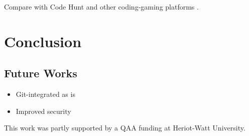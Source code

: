 \documentclass[sigplan,10pt,review]{acmart}\settopmatter{printfolios=true}
\begin{document}
Compare with Code Hunt and other coding-gaming platforms \cite{CHESE}.


\section{Conclusion}


\subsection{Future Works}


\begin{itemize}
\item Git-integrated as is \cite{Rue+Hic+Par+Lev+Mem+Pla+Mar_CCS-2016}
\item Improved security
\end{itemize}





\begin{acks}                            %
This work was partly supported by a QAA funding at Heriot-Watt University.
\end{acks}





\begin{acronym}[MOOC]
\end{acronym}
\end{document}
